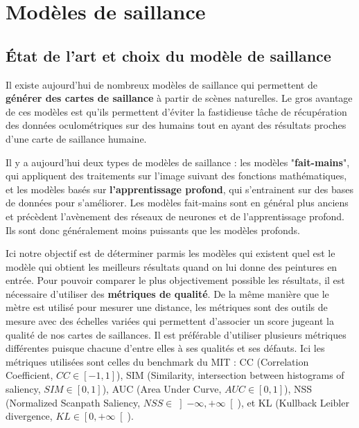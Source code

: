 \chapter{Modèles de saillance}

\section{État de l'art et choix du modèle de saillance}

\par
Il existe aujourd'hui de nombreux modèles de saillance qui permettent de \textbf{générer des cartes de saillance} à partir de scènes naturelles. Le gros avantage de ces modèles est qu'ils permettent d'éviter la fastidieuse tâche de récupération des données oculométriques sur des humains tout en ayant des résultats proches d'une carte de saillance humaine.

\par
Il y a aujourd'hui deux types de modèles de saillance : les modèles "\textbf{fait-mains}", qui appliquent des traitements sur l'image suivant des fonctions mathématiques, et les modèles basés sur \textbf{l'apprentissage profond}, qui s'entrainent sur des bases de données pour s'améliorer. Les modèles fait-mains sont en général plus anciens et précèdent l'avènement des réseaux de neurones et de l'apprentissage profond. Ils sont donc généralement moins puissants que les modèles profonds.

\par
Ici notre objectif est de déterminer parmis les modèles qui existent quel est le modèle qui obtient les meilleurs résultats quand on lui donne des peintures en entrée. Pour pouvoir comparer le plus objectivement possible les résultats, il est nécessaire d'utiliser des \textbf{métriques de qualité}. De la même manière que le mètre est utilisé pour mesurer une distance, les métriques sont des outils de mesure avec des échelles variées qui permettent d'associer un score jugeant la qualité de nos cartes de saillances. Il est préférable d'utiliser plusieurs métriques différentes puisque chacune d'entre elles à ses qualités et ses défauts. Ici les métriques utilisées sont celles du benchmark du MIT \cite{benchmark_MIT}: CC (Correlation Coefficient, $CC\in\left[-1,1\right]$), SIM (Similarity, intersection between histograms of saliency, $SIM\in\left[0,1\right]$), AUC (Area Under Curve, $AUC\in\left[0,1\right]$), NSS (Normalized Scanpath Saliency, $NSS\in\left]-\infty,+\infty\right[$), et KL (Kullback Leibler divergence, $KL\in\left[0,+\infty\right[$).

